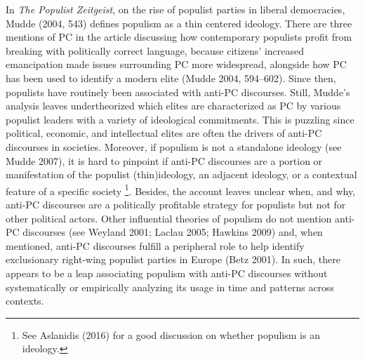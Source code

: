 \documentclass[smallextended]{svjour3}       %
\begin{document}
In \emph{The Populist Zeitgeist}, on the rise of populist parties in
liberal democracies, Mudde (2004, 543) defines populism as a thin
centered ideology. There are three mentions of PC in the article
discussing how contemporary populists profit from breaking with
politically correct language, because citizens' increased emancipation
made issues surrounding PC more widespread, alongside how PC has been
used to identify a modern elite (Mudde 2004, 594--602). Since then,
populists have routinely been associated with anti-PC discourses. Still,
Mudde's analysis leaves undertheorized which elites are characterized as
PC by various populist leaders with a variety of ideological
commitments. This is puzzling since political, economic, and
intellectual elites are often the drivers of anti-PC discourses in
societies. Moreover, if populism is not a standalone ideology (see Mudde
2007), it is hard to pinpoint if anti-PC discourses are a portion or
manifestation of the populist (thin)ideology, an adjacent ideology, or a
contextual feature of a specific society \footnote{ See Aslanidis (2016)
  for a good discussion on whether populism is an ideology.}. Besides,
the account leaves unclear when, and why, anti-PC discourses are a
politically profitable strategy for populists but not for other
political actors. Other influential theories of populism do not mention
anti-PC discourses (see Weyland 2001; Laclau 2005; Hawkins 2009) and,
when mentioned, anti-PC discourses fulfill a peripheral role to help
identify exclusionary right-wing populist parties in Europe (Betz 2001).
In such, there appears to be a leap associating populism with anti-PC
discourses without systematically or empirically analyzing its usage in
time and patterns across contexts.
\end{document}
